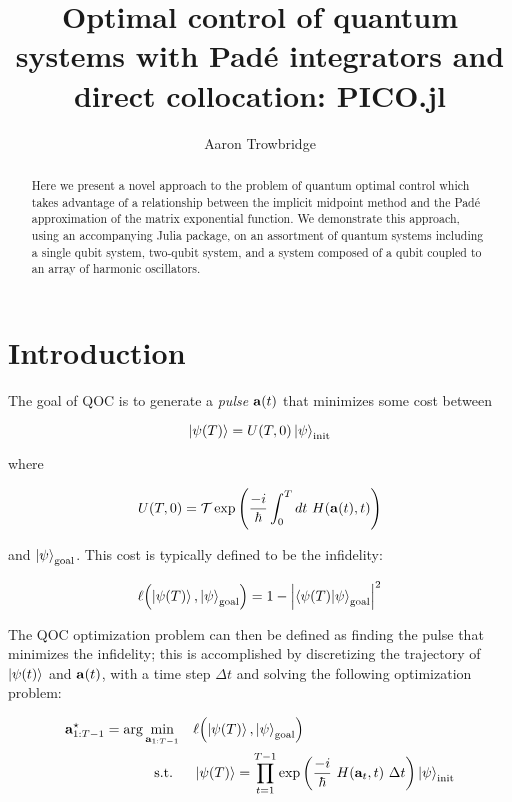 \documentclass{article}
\title{Optimal control of quantum systems with Pad\'e integrators and direct collocation: PICO.jl}
\author{Aaron Trowbridge}
\date{}
\begin{document}
\maketitle


\begin{abstract}
  Here we present a novel approach to the problem of quantum optimal control which takes advantage of a relationship between the implicit midpoint method and the Pad\'e approximation of the matrix exponential function. We demonstrate this approach, using an accompanying Julia package, on an assortment of quantum systems including a single qubit system, two-qubit system, and a system composed of a qubit coupled to an array of harmonic oscillators.
\end{abstract}

\tableofcontents

\newpage


\section{Introduction}

The goal of QOC is to generate a \textit{pulse} $\vb{a}(t)$ that minimizes some cost between 

\begin{equation} 
  \ket{\psi(T)} = U(T, 0) \ket{\psi}_{\text{init}}
\end{equation}

where

\begin{equation}
  U(T, 0) = \mathcal{T} \exp \qty( \frac{-i}{\hbar} \int_0^T dt \ H(\vb{a}(t), t)) 
\end{equation}

and $\ket{\psi}_{\text{goal}}$. This cost is typically defined to be the infidelity:

\begin{equation}
  \ell \qty(\ket{\psi(T)}, \ket{\psi}_{\text{goal}}) = 1 - \abs{\bra{\psi(T)} \ket{\psi}_{\text{goal}}}^2
\end{equation}

The QOC optimization problem can then be defined as finding the pulse that minimizes the infidelity; this is accomplished by discretizing the trajectory of $\ket{\psi(t)}$ and $\vb{a}(t)$, with a time step $\Delta t$ and solving the following optimization problem:

\begin{align*}
  \vb{a}^\star_{1:T-1} = \arg \min_{\vb{a}_{1:T-1}} \quad &\ell \qty(\ket{\psi(T)}, \ket{\psi}_{\text{goal}})\\
  \text{s.t. } \quad 
    & \ket{\psi(T)} = \prod_{t=1}^{T-1} \exp \qty( \frac{-i}{\hbar} \ H(\vb{a}_t, t) \ \Delta t) \ket{\psi}_{\text{init}} \\
\end{align*}
\end{document}
